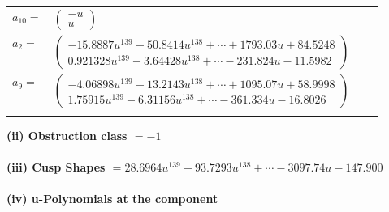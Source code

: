 \documentclass[1p]{elsarticle_modified}
\theoremstyle{definition}
\begin{document}
\begin{tabular}{m{7pt} m{180pt} m{7pt} m{180pt} }
\flushright $a_{10}=$&$\begin{pmatrix}- u\\u\end{pmatrix}$ \\
\flushright $a_{2}=$&$\begin{pmatrix}-15.8887 u^{139}+50.8414 u^{138}+\cdots+1793.03 u+84.5248\\0.921328 u^{139}-3.64428 u^{138}+\cdots-231.824 u-11.5982\end{pmatrix}$ \\
\flushright $a_{9}=$&$\begin{pmatrix}-4.06898 u^{139}+13.2143 u^{138}+\cdots+1095.07 u+58.9998\\1.75915 u^{139}-6.31156 u^{138}+\cdots-361.334 u-16.8026\end{pmatrix}$\\&\end{tabular}
\flushleft \textbf{(ii) Obstruction class $= -1$}\\~\\
\flushleft \textbf{(iii) Cusp Shapes $= 28.6964 u^{139}-93.7293 u^{138}+\cdots-3097.74 u-147.900$}\\~\\
\newpage\renewcommand{\arraystretch}{1}
\flushleft \textbf{(iv) u-Polynomials at the component}\newline \\
\end{document}

